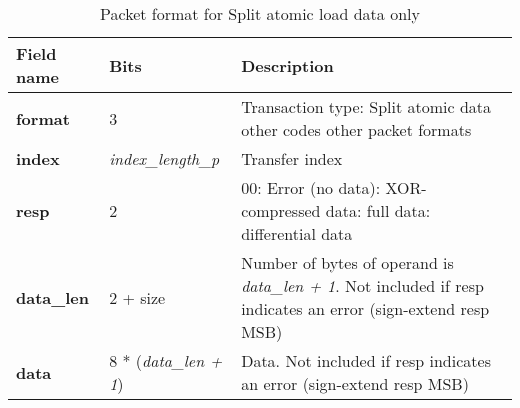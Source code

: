 \begin{table}[htp]
  \centering
  \caption{Packet format for Split atomic load data only}
  \label{tab:te_datadx0y9}
  \begin{tabulary}{\textwidth}{|l|p{40mm}|p{90mm}|}
    \hline
    {\bf Field name} & {\bf Bits} & {\bf Description} \\
    \hline
    \textbf{format} & 	3	& Transaction type: Split atomic data\newline	
		other codes other packet formats\\
    \hline
    \textbf{index} & \textit{index\_length\_p} & Transfer index\\
    \textbf{resp} & 2 & 00: Error (no data):  XOR-compressed data: full data: differential data\\
    \hline
    \textbf{data\_len} & 2 + size &	Number of bytes of operand is \textit{data\_len + 1}. Not included if resp indicates an error (sign-extend resp MSB)\\
    \hline
    \textbf{data} &  8 * (\textit{data\_len + 1}) & Data. Not included if resp indicates an error (sign-extend resp MSB)\\
    \hline
  \end{tabulary}
\end{table}

